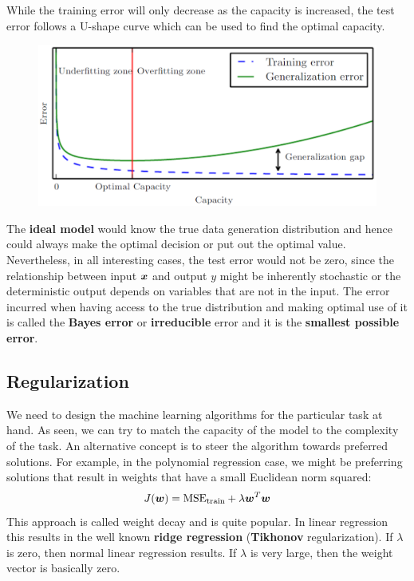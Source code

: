 \begin{multicols}{2}
	While the training error will only decrease as the capacity is increased, the test error follows a U-shape curve which can be used to find the optimal capacity.
	\begin{figure}[H]
		\centering
		\includegraphics[width=0.95\linewidth]{images/gen_curve.PNG}
	\end{figure}

	The \textbf{ideal model} would know the true data generation distribution and hence could always make the optimal decision or put out the optimal value.
	Nevertheless, in all interesting cases, the test error would not be zero, since the relationship between input $\bol{x}$ and output $y$ might be inherently stochastic or the deterministic output depends on variables that are not in the input.
	The error incurred when having access to the true distribution and making optimal use of it is called the \textbf{Bayes error} or \textbf{irreducible} error and it is the \textbf{smallest possible error}.

	\subsection{Regularization}
	We need to design the machine learning algorithms for the particular task at hand.
	As seen, we can try to match the capacity of the model to the complexity of the task.
	An alternative concept is to steer the algorithm towards preferred solutions.
	For example, in the polynomial regression case, we might be preferring solutions that result in weights that have a small Euclidean norm squared:
	\[ J(\bol{w}) = \text{MSE}_{\text{train}} + \lambda \bol{w}^T\bol{w} \]
	This approach is called weight decay and is quite popular.
	In linear regression this results in the well known \textbf{ridge regression} (\textbf{Tikhonov} regularization).
	If $\lambda$ is zero, then normal linear regression results.
	If $\lambda$ is very large, then the weight vector is basically zero.\\


\end{multicols}
